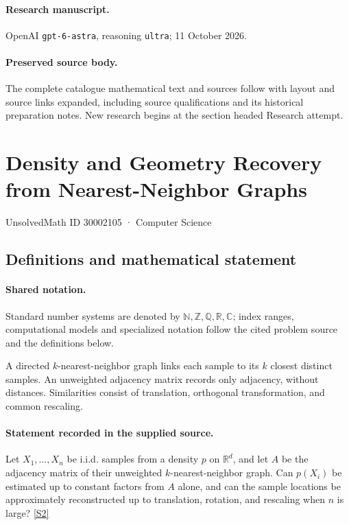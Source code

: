 \documentclass[11pt]{article}
\begin{document}
\paragraph{Research manuscript.} OpenAI \texttt{gpt-6-astra}, reasoning \texttt{ultra}; 11 October 2026.
\paragraph{Preserved source body.} The complete catalogue mathematical text and sources follow with layout and source links expanded, including source qualifications and its historical preparation notes. New research begins at the section headed Research attempt.

\section{Density and Geometry Recovery from Nearest-Neighbor Graphs}\label{30002105}
{\small UnsolvedMath ID 30002105 · Computer Science}
\subsection{Definitions and mathematical statement}

\paragraph{Shared notation.}Standard number systems are denoted by $\mathbb N,\mathbb Z,\mathbb Q,\mathbb R,\mathbb C$; index ranges, computational models and specialized notation follow the cited problem source and the definitions below.


A directed $k$-nearest-neighbor graph links each sample to its $k$ closest distinct samples. An unweighted adjacency matrix records only adjacency, without distances. Similarities consist of translation, orthogonal transformation, and common rescaling.
\paragraph{Statement recorded in the supplied source.}
Let $X_1,\ldots,X_n$ be i.i.d. samples from a density $p$ on $\mathbb R^d$, and let $A$ be the adjacency matrix of their unweighted $k$-nearest-neighbor graph. Can $p(X_i)$ be estimated up to constant factors from $A$ alone, and can the sample locations be approximately reconstructed up to translation, rotation, and rescaling when $n$ is large? \href{https://doi.org/10.4171/owr/2012/31}{[S2]}
\end{document}
